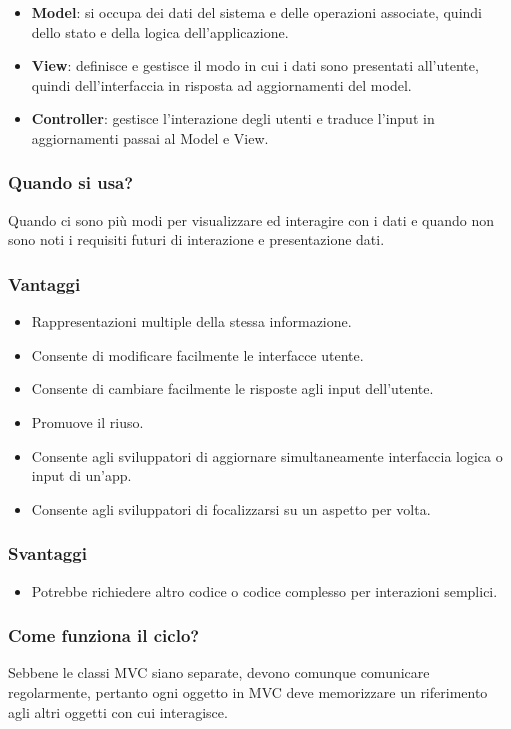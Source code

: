 \documentclass{report}
\begin{document}
\begin{itemize}
    \item \textbf{Model}: si occupa dei dati del sistema e delle operazioni associate, quindi dello stato e della logica dell'applicazione.
    \item \textbf{View}: definisce e gestisce il modo in cui i dati sono presentati all'utente, quindi dell'interfaccia in risposta ad aggiornamenti del model.
    \item \textbf{Controller}: gestisce l'interazione degli utenti e traduce l'input in aggiornamenti passai al Model e View.
\end{itemize}

\noindent
\subsubsection*{Quando si usa?}
Quando ci sono più modi per visualizzare ed interagire con i dati e quando non sono noti i requisiti futuri di interazione e presentazione dati.

\subsubsection*{Vantaggi}
\begin{itemize}
    \item Rappresentazioni multiple della stessa informazione.
    \item Consente di modificare facilmente le interfacce utente.
    \item Consente di cambiare facilmente le risposte agli input dell'utente.
    \item Promuove il riuso.
    \item Consente agli sviluppatori di aggiornare simultaneamente interfaccia logica o input di un'app.
    \item Consente agli sviluppatori di focalizzarsi su un aspetto per volta.
\end{itemize}

\subsubsection*{Svantaggi}
\begin{itemize}
    \item Potrebbe richiedere altro codice o codice complesso per interazioni semplici.
\end{itemize}

\subsubsection*{Come funziona il ciclo?}
Sebbene le classi MVC siano separate, devono comunque comunicare regolarmente, pertanto ogni oggetto in MVC deve memorizzare un riferimento agli altri oggetti con cui interagisce.
\end{document}
